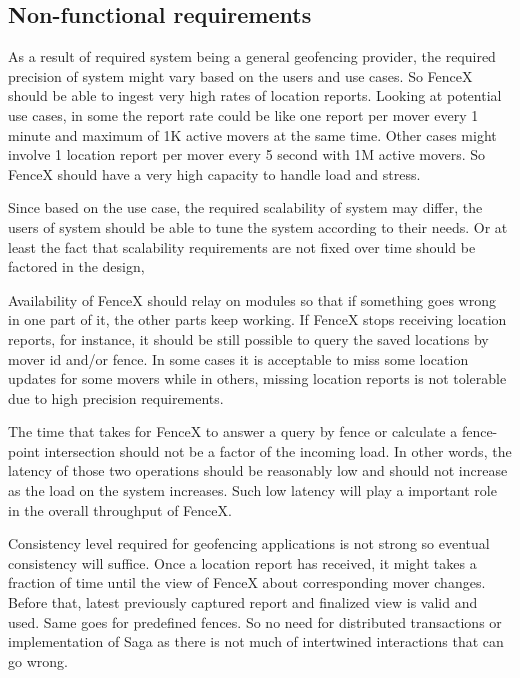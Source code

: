 \documentclass[a4]{report}
\begin{document}
        \subsection{Non-functional requirements}
        As a result of required system being a general geofencing provider, the required precision of system might vary
        based on the users and use cases.
        So FenceX should be able to ingest very high rates of location reports.
        Looking at potential use cases, in some the report rate could be like one report per mover every 1 minute and
        maximum of 1K active movers at the same time.
        Other cases might involve 1 location report per mover every 5 second with 1M active movers.
        So FenceX should have a very high capacity to handle load and stress.

        Since based on the use case, the required scalability of system may differ, the users of system should be able to
        tune the system according to their needs.
        Or at least the fact that scalability requirements are not fixed over time should be factored in the design,

        Availability of FenceX should relay on modules so that if something goes wrong in one part of it, the other parts
        keep working.
        If FenceX stops receiving location reports, for instance, it should be still possible to query the saved
        locations by mover id and/or fence.
        In some cases it is acceptable to miss some location updates for some movers while in others, missing location
        reports is not tolerable due to high precision requirements.

        The time that takes for FenceX to answer a query by fence or calculate a fence-point intersection should not be a
        factor of the incoming load.
        In other words, the latency of those two operations should be reasonably low and should not increase as the load
        on the system increases.
        Such low latency will play a important role in the overall throughput of FenceX.

        Consistency level required for geofencing applications is not strong so eventual consistency will suffice.
        Once a location report has received, it might takes a fraction of time until the view of FenceX about
        corresponding mover changes.
        Before that, latest previously captured report and finalized view is valid and used.
        Same goes for predefined fences.
        So no need for distributed transactions or implementation of Saga as there is not much of intertwined
        interactions that can go wrong.
\end{document}
